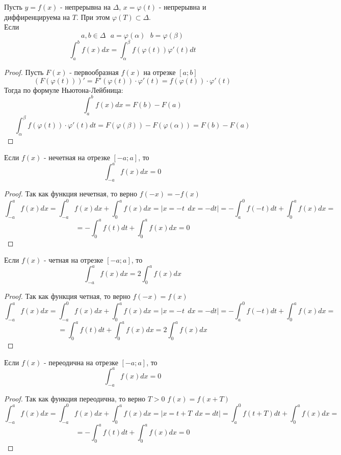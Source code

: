 \begin{theorem}
  Пусть $y = f(x)$ - непрерывна на $\Delta$, $x = \varphi (t)$ - непрерывна и
  диффиренцируема на $T$. При этом $\varphi (T) \subset \Delta$.\\
  Если
  \[a, b \in \Delta ~~~ a = \varphi (\alpha) ~~~ b = \varphi (\beta)\]
  \[\int^b_a f(x)dx = \int^{\beta}_{\alpha} f(\varphi (t)) \varphi' (t)dt\]
\end{theorem}

\begin{proof}
  Пусть $F(x)$ - первообразная $f(x)$ на отрезке $[a; b]$\\
  \[
    (F(\varphi (t)))' = F'(\varphi (t)) \cdot \varphi' (t) = f(\varphi(t))
    \cdot \varphi'(t)
  \]
  Тогда по формуле Ньютона-Лейбница:
  \[\int^b_a f(x)dx = F(b) - F(a)\]
  \[
    \int^{\beta}_{\alpha} f(\varphi (t)) \cdot \varphi' (t)dt =
    F(\varphi (\beta)) - F(\varphi (\alpha)) = F(b) - F(a)
  \]
\end{proof}

\begin{theorem}
  Если $f(x)$ - нечетная на отрезке $[-a; a]$, то
  \[\int^a_{-a} f(x)dx = 0\]
\end{theorem}

\begin{proof}
  Так как функция нечетная, то верно $f(-x) = -f(x)$
  \[\int^a_{-a} f(x)dx = \int^0_{-a} f(x)dx + \int^a_0 f(x)dx =
    |x = -t ~~ dx = -dt| = -\int^0_a f(-t)dt + \int^a_0 f(x)dx =\]
    \[= -\int^a_0 f(t)dt + \int^a_0 f(x)dx = 0\]
\end{proof}

\begin{theorem}
  Если $f(x)$ - четная на отрезке $[-a; a]$, то
  \[\int^a_{-a} f(x)dx = 2\int^a_{0} f(x)dx \]
\end{theorem}

\begin{proof}
  Так как функция четная, то верно $f(-x) = f(x)$
  \[\int^a_{-a} f(x)dx = \int^0_{-a} f(x)dx + \int^a_0 f(x)dx =
    |x = -t ~~ dx = -dt| = -\int^0_a f(-t)dt + \int^a_0 f(x)dx =\]
    \[= \int^a_0 f(t)dt + \int^a_0 f(x)dx = 2\int^a_{0} f(x)dx\]
\end{proof}

\begin{theorem}
  Если $f(x)$ - переодична на отрезке $[-a; a]$, то
  \[\int^a_{-a} f(x)dx = 0\]
\end{theorem}

\begin{proof}
  Так как функция переодична, то верно $T>0$ $f(x) = f(x+T)$
  \[\int^a_{-a} f(x)dx = \int^0_{-a} f(x)dx + \int^a_0 f(x)dx =
    |x = t+T ~~ dx = dt| = \int^0_a f(t+T)dt + \int^a_0 f(x)dx =\]
    \[= -\int^a_0 f(t)dt + \int^a_0 f(x)dx = 0\]
\end{proof}